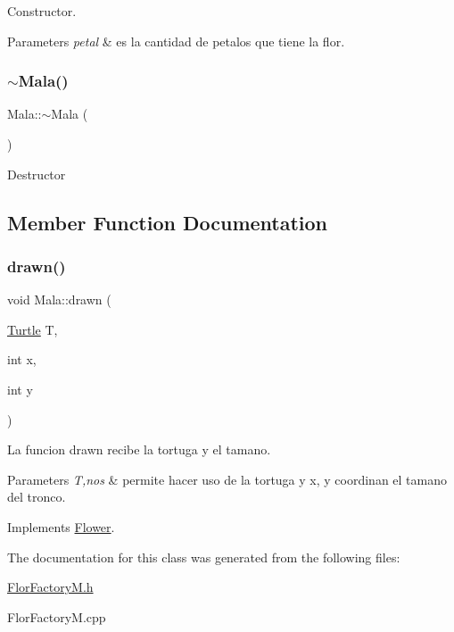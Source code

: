 Constructor. 
\begin{DoxyParams}{Parameters}
{\em petal} & es la cantidad de petalos que tiene la flor. \\
\hline
\end{DoxyParams}
\mbox{\label{classMala_a4488bbbe9c752a1afa6eead941050a72}} 
\subsubsection{\texorpdfstring{$\sim$\+Mala()}{~Mala()}}
{\footnotesize\ttfamily Mala\+::$\sim$\+Mala (\begin{DoxyParamCaption}{ }\end{DoxyParamCaption})}

Destructor 

\subsection{Member Function Documentation}
\mbox{\label{classMala_ab62f3d5d10d96d5047b3842e02f160c3}} 
\subsubsection{\texorpdfstring{drawn()}{drawn()}}
{\footnotesize\ttfamily void Mala\+::drawn (\begin{DoxyParamCaption}\item[{\hyperlink{classTurtle}{Turtle}}]{T,  }\item[{int}]{x,  }\item[{int}]{y }\end{DoxyParamCaption})\hspace{0.3cm}{\ttfamily [virtual]}}

La funcion drawn recibe la tortuga y el tamano. 
\begin{DoxyParams}{Parameters}
{\em T,nos} & permite hacer uso de la tortuga y x, y coordinan el tamano del tronco. \\
\hline
\end{DoxyParams}


Implements \hyperlink{classFlower_af01eea570f9d02e16cda1d86ee97633c}{Flower}.



The documentation for this class was generated from the following files\+:\begin{DoxyCompactItemize}
\item 
\hyperlink{FlorFactoryM_8h}{Flor\+Factory\+M.\+h}\item 
Flor\+Factory\+M.\+cpp\end{DoxyCompactItemize}
